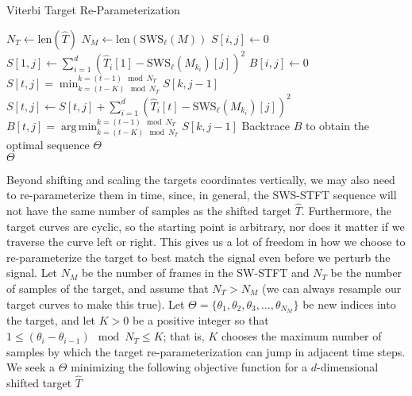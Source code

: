 \documentclass[runningheads]{llncs}
\DeclareMathOperator*{\argmin}{arg\,min}
\begin{document}
\algrenewcommand\algorithmicindent{0.8em}%
\begin{algorithm}
  \caption{Viterbi Target Re-Parameterization}

  \begin{algorithmic}[1]
    \State $N_T \gets \text{len}(\hat{T})$ 
    \State $N_M \gets \text{len}(\text{SWS}_{\ell}({M}))$ 
    \State $S[i, j] \gets 0$ 
    \State $S[1, j] \gets \sum_{i=1}^d (\hat{T}_i[1] - \text{SWS}_{\ell} ({M_{k_i}})[j])^2$
    \State $B[i, j] \gets 0$ 
            \State $S[t, j] = \min_{k=(t-K) \mod N_T} ^ {k=(t-1) \mod N_T} S[k, j-1] $ 
            \State $S[t, j] \gets S[t, j] + \sum_{i=1}^d (\hat{T}_i[t] - \text{SWS}_{\ell} ({M_{k_i}})[j])^2$ 
            \State $B[t, j] = \argmin_{k=(t-K) \mod N_T} ^ {k=(t-1) \mod N_T} S[k, j-1] $ 
        \EndFor
    \EndFor
    \State Backtrace $B$ to obtain the optimal sequence $\Theta$ \\
    \Return $\Theta$
    \EndProcedure
  \end{algorithmic}
  \label{alg:viterbiwarp}
\end{algorithm}

Beyond shifting and scaling the targets coordinates vertically, we may also need to re-parameterize them in time, since, in general, the SWS-STFT sequence will not have the same number of samples as the shifted target $\hat{T}$.  Furthermore, the target curves are cyclic, so the starting point is arbitrary, nor does it matter if we traverse the curve left or right.  This gives us a lot of freedom in how we choose to re-parameterize the target to best match the signal even before we perturb the signal.  Let $N_M$ be the number of frames in the SW-STFT and $N_T$ be the number of samples of the target, and assume that $N_T > N_M$ (we can always resample our target curves to make this true).  Let $\Theta = \{ \theta_1, \theta_2, \theta_3, \hdots, \theta_{N_M} \}$ be new indices into the target, and let $K > 0$ be a positive integer so that $1 \leq (\theta_i - \theta_{i-1}) \mod N_T \leq K$; that is, $K$ chooses the maximum number of samples by which the target re-parameterization can jump in adjacent time steps.  We seek a $\Theta$ minimizing the following objective function for a $d$-dimensional shifted target $\hat{T}$
\end{document}
